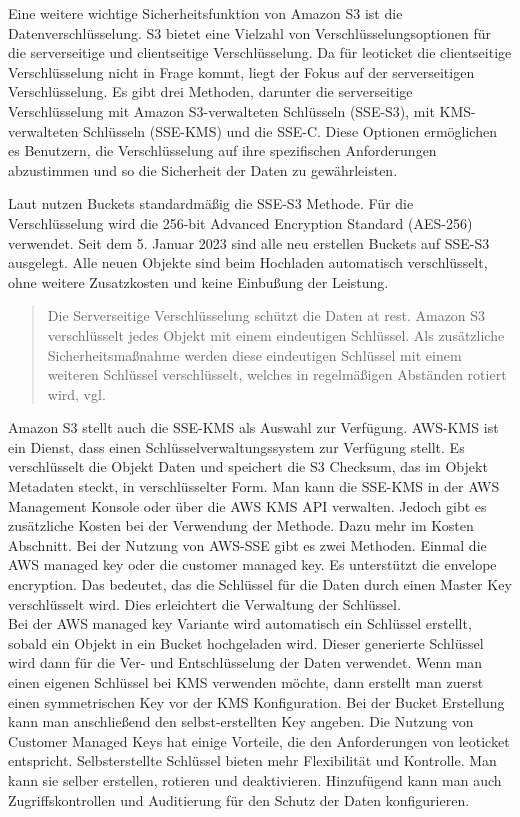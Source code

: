 Eine weitere wichtige Sicherheitsfunktion von Amazon S3 ist die Datenverschlüsselung. S3 bietet eine Vielzahl von Verschlüsselungsoptionen für die serverseitige und clientseitige Verschlüsselung. Da für leoticket die clientseitige Verschlüsselung nicht in Frage kommt, liegt der Fokus auf der serverseitigen Verschlüsselung. Es gibt drei Methoden, darunter die serverseitige Verschlüsselung mit Amazon S3-verwalteten Schlüsseln (SSE-S3), mit KMS-verwalteten Schlüsseln (SSE-KMS) und die SSE-C. Diese Optionen ermöglichen es Benutzern, die Verschlüsselung auf ihre spezifischen Anforderungen abzustimmen und so die Sicherheit der Daten zu gewährleisten.

Laut \citeauthor{aws-iam-s3} nutzen Buckets standardmäßig die SSE-S3 Methode. Für die Verschlüsselung wird die 256-bit Advanced Encryption Standard (AES-256) verwendet. Seit dem 5. Januar 2023 sind alle neu erstellen Buckets auf SSE-S3 ausgelegt. Alle neuen Objekte sind beim Hochladen automatisch verschlüsselt, ohne weitere Zusatzkosten und keine Einbußung der Leistung.

\begin{quote}
	Die Serverseitige Verschlüsselung schützt die Daten at rest. Amazon S3 verschlüsselt jedes Objekt mit einem eindeutigen Schlüssel. Als zusätzliche Sicherheitsmaßnahme werden diese eindeutigen Schlüssel mit einem weiteren Schlüssel verschlüsselt, welches in regelmäßigen Abständen rotiert wird, vgl. \cite{aws-iam-s3}
\end{quote}

Amazon S3 stellt auch die SSE-KMS als Auswahl zur Verfügung. AWS-KMS ist ein Dienst, dass einen Schlüsselverwaltungssystem zur Verfügung stellt. Es verschlüsselt die Objekt Daten und speichert die S3 Checksum, das im Objekt Metadaten steckt, in verschlüsselter Form. Man kann die SSE-KMS in der AWS Management Konsole oder über die AWS KMS API verwalten. Jedoch gibt es zusätzliche Kosten bei der Verwendung der Methode. Dazu mehr im Kosten Abschnitt. Bei der Nutzung von AWS-SSE gibt es zwei Methoden. Einmal die AWS managed key oder die customer managed key. Es unterstützt die \glqq envelope encryption\grqq. Das bedeutet, das die Schlüssel für die Daten durch einen Master Key verschlüsselt wird. Dies erleichtert die Verwaltung der Schlüssel.\\

Bei der AWS managed key Variante wird automatisch ein Schlüssel erstellt, sobald ein Objekt in ein Bucket hochgeladen wird. Dieser generierte Schlüssel wird dann für die Ver- und Entschlüsselung der Daten verwendet. Wenn man einen eigenen Schlüssel bei KMS verwenden möchte, dann erstellt man zuerst einen symmetrischen Key vor der KMS Konfiguration. Bei der Bucket Erstellung kann man anschließend den selbst-erstellten Key angeben. Die Nutzung von Customer Managed Keys hat einige Vorteile, die den Anforderungen von leoticket entspricht. Selbsterstellte Schlüssel bieten mehr Flexibilität und Kontrolle. Man kann sie selber erstellen, rotieren und deaktivieren. Hinzufügend kann man auch Zugriffskontrollen und Auditierung für den Schutz der Daten konfigurieren.\\

